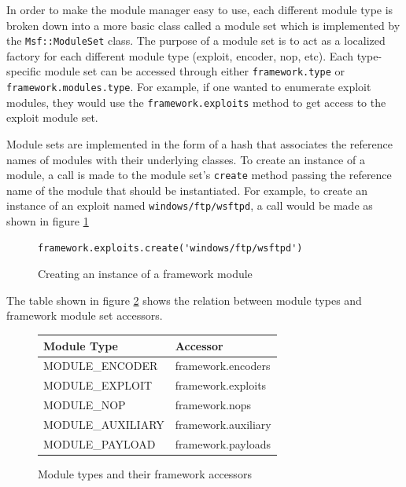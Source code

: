 \documentclass{report}
\begin{document}
\par
In order to make the module manager easy to use, each different
module type is broken down into a more basic class called a module
set which is implemented by the \texttt{Msf::ModuleSet} class.  The
purpose of a module set is to act as a localized factory for each
different module type (exploit, encoder, nop, etc).  Each
type-specific module set can be accessed through either
\texttt{framework.type} or \texttt{framework.modules.type}.  For
example, if one wanted to enumerate exploit modules, they would use
the \texttt{framework.exploits} method to get access to the exploit
module set.

\par
Module sets are implemented in the form of a hash that associates
the reference names of modules with their underlying classes.  To
create an instance of a module, a call is made to the module set's
\texttt{create} method passing the reference name of the module that
should be instantiated.  For example, to create an instance of an
exploit named \texttt{windows/ftp/wsftpd}, a call would be made as
shown in figure \ref{fig-code-framework-modcreate}

\begin{figure}[h]
\begin{verbatim}
framework.exploits.create('windows/ftp/wsftpd')
\end{verbatim}
\caption{Creating an instance of a framework module}
\label{fig-code-framework-modcreate}
\end{figure}

\par
The table shown in figure \ref{fig-table-modulsets} shows the
relation between module types and framework module set accessors.

\begin{figure}[h]
\begin{center}
\begin{tabular}{|l|l|}
\hline
\textbf{Module Type} & \textbf{Accessor} \\
\hline
MODULE\_ENCODER & framework.encoders \\
MODULE\_EXPLOIT & framework.exploits \\
MODULE\_NOP & framework.nops \\
MODULE\_AUXILIARY & framework.auxiliary \\
MODULE\_PAYLOAD & framework.payloads \\
\hline
\end{tabular}
\caption{Module types and their framework accessors}
\label{fig-table-modulsets}
\end{center}
\end{figure}
\end{document}
